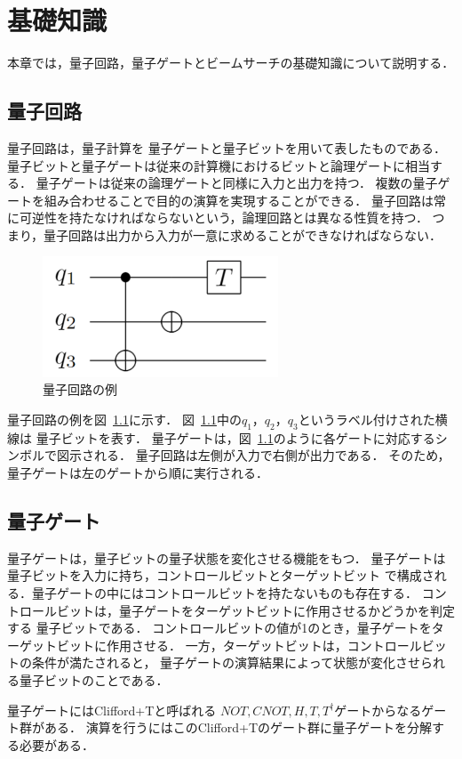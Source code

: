 \chapter{基礎知識}
本章では，量子回路，量子ゲートとビームサーチの基礎知識について説明する．
\section{量子回路}
量子回路は，量子計算\cite{deutsch1985quantum}を
量子ゲートと量子ビットを用いて表したものである．
量子ビットと量子ゲートは従来の計算機におけるビットと論理ゲートに相当する．
量子ゲートは従来の論理ゲートと同様に入力と出力を持つ．
複数の量子ゲートを組み合わせることで目的の演算を実現することができる．
量子回路は常に可逆性を持たなければならないという，論理回路とは異なる性質を持つ．
つまり，量子回路は出力から入力が一意に求めることができなければならない．
\par 
\begin{figure}[tbp]
  \centering
  \includegraphics[width=7cm]{img/qcircuit.pdf}
  \caption{量子回路の例}
  \label{qcircuit}
\end{figure}
量子回路の例を図~\ref{qcircuit}に示す．
図~\ref{qcircuit}中の$q_{1}$，$q_{2}$，$q_{3}$というラベル付けされた横線は
量子ビットを表す．
量子ゲートは，図~\ref{qcircuit}のように各ゲートに対応するシンボルで図示される．
量子回路は左側が入力で右側が出力である．
そのため，量子ゲートは左のゲートから順に実行される．
\section{量子ゲート}
量子ゲートは，量子ビットの量子状態を変化させる機能をもつ．
量子ゲートは量子ビットを入力に持ち，コントロールビットとターゲットビット
で構成される．量子ゲートの中にはコントロールビットを持たないものも存在する．
コントロールビットは，量子ゲートをターゲットビットに作用させるかどうかを判定する
量子ビットである．
コントロールビットの値が1のとき，量子ゲートをターゲットビットに作用させる．
一方，ターゲットビットは，コントロールビットの条件が満たされると，
量子ゲートの演算結果によって状態が変化させられる量子ビットのことである．
\par
量子ゲートにはClifford+T\cite{zhou2000methodology}と呼ばれる
$NOT, CNOT, H, T,T^{\dagger}$ゲートからなるゲート群がある．
演算を行うにはこのClifford+Tのゲート群に量子ゲートを分解する必要がある\cite{boykin2000new}．
\par
{}
